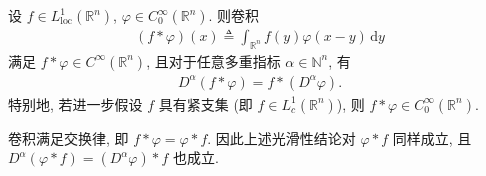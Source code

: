 \documentclass[../../main.tex]{subfiles}%
\begin{document}
\begin{theorem}\label{theorem:实分析--卷积磨光性质}
设 $f\in L_{\mathrm{loc}}^1(\mathbb{R}^n)$, $\varphi\in C_0^\infty(\mathbb{R}^n)$. 则卷积
\begin{align*}
(f*\varphi)(x)\triangleq\int_{\mathbb{R}^n} f(y)\varphi(x-y)\,\mathrm{d}y
\end{align*}
满足 $f*\varphi\in C^\infty(\mathbb{R}^n)$, 且对于任意多重指标 $\alpha\in\mathbb{N}^n$, 有
\begin{align*}
D^\alpha(f*\varphi)=f*(D^\alpha\varphi).
\end{align*}
特别地, 若进一步假设 $f$ 具有紧支集 (即 $f\in L_c^1(\mathbb{R}^n)$), 则 $f*\varphi\in C_0^\infty(\mathbb{R}^n)$.
\end{theorem}
\begin{remark}
卷积满足交换律, 即 $f*\varphi=\varphi*f$. 因此上述光滑性结论对 $\varphi*f$ 同样成立, 且 $D^\alpha(\varphi*f)=(D^\alpha\varphi)*f$ 也成立.
\end{remark}
\end{document}
